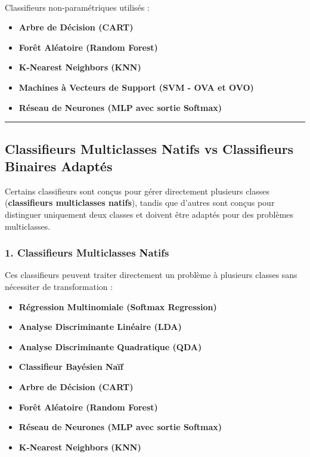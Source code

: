 \documentclass[
]{article}
\makeatletter
\let\oldparagraph\paragraph
\renewcommand{\paragraph}{
    \@ifstar
      \xxxParagraphStar
      \xxxParagraphNoStar
  }
\newcommand{\xxxParagraphStar}[1]{\oldparagraph*{#1}\mbox{}}
\newcommand{\xxxParagraphNoStar}[1]{\oldparagraph{#1}\mbox{}}
\providecommand{\tightlist}{%
  \setlength{\itemsep}{0pt}\setlength{\parskip}{0pt}}\usepackage{longtable,booktabs,array}
\makeatother
\begin{document}
\paragraph{Classifieurs non-paramétriques utilisés
:}\label{classifieurs-non-paramuxe9triques-utilisuxe9s}

\begin{itemize}
\tightlist
\item
  \textbf{Arbre de Décision (CART)}
\item
  \textbf{Forêt Aléatoire (Random Forest)}
\item
  \textbf{K-Nearest Neighbors (KNN)}
\item
  \textbf{Machines à Vecteurs de Support (SVM - OVA et OVO)}
\item
  \textbf{Réseau de Neurones (MLP avec sortie Softmax)}
\end{itemize}

\begin{center}\rule{0.5\linewidth}{0.5pt}\end{center}

\subsection{Classifieurs Multiclasses Natifs vs Classifieurs Binaires
Adaptés}\label{classifieurs-multiclasses-natifs-vs-classifieurs-binaires-adaptuxe9s}

Certains classifieurs sont conçus pour gérer directement plusieurs
classes (\textbf{classifieurs multiclasses natifs}), tandis que d'autres
sont conçus pour distinguer uniquement deux classes et doivent être
adaptés pour des problèmes multiclasses.

\subsubsection{1. Classifieurs Multiclasses
Natifs}\label{classifieurs-multiclasses-natifs}

Ces classifieurs peuvent traiter directement un problème à plusieurs
classes sans nécessiter de transformation :

\begin{itemize}
\tightlist
\item
  \textbf{Régression Multinomiale (Softmax Regression)}
\item
  \textbf{Analyse Discriminante Linéaire (LDA)}
\item
  \textbf{Analyse Discriminante Quadratique (QDA)}
\item
  \textbf{Classifieur Bayésien Naïf}
\item
  \textbf{Arbre de Décision (CART)}
\item
  \textbf{Forêt Aléatoire (Random Forest)}
\item
  \textbf{Réseau de Neurones (MLP avec sortie Softmax)}
\item
  \textbf{K-Nearest Neighbors (KNN)}
\end{itemize}
\end{document}
